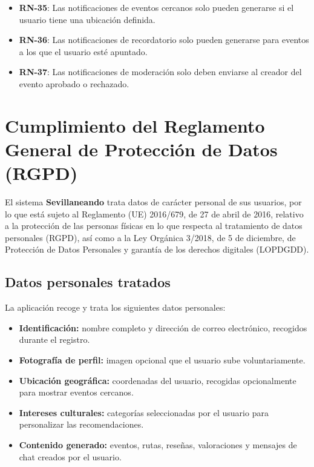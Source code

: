 \begin{itemize}
    \item \textbf{RN-35}: Las notificaciones de eventos cercanos solo pueden generarse si el usuario tiene una ubicación definida.
    \item \textbf{RN-36}: Las notificaciones de recordatorio solo pueden generarse para eventos a los que el usuario esté apuntado.
    \item \textbf{RN-37}: Las notificaciones de moderación solo deben enviarse al creador del evento aprobado o rechazado.
\end{itemize}

\section{Cumplimiento del Reglamento General de Protección de Datos (RGPD)}\label{sec:rgpd}

El sistema \textbf{Sevillaneando} trata datos de carácter personal de sus usuarios, por lo que está sujeto al Reglamento (UE) 2016/679, de 27 de abril de 2016, relativo a la protección de las personas físicas en lo que respecta al tratamiento de datos personales (RGPD), así como a la Ley Orgánica 3/2018, de 5 de diciembre, de Protección de Datos Personales y garantía de los derechos digitales (LOPDGDD).

\subsection{Datos personales tratados}

La aplicación recoge y trata los siguientes datos personales:

\begin{itemize}
    \item \textbf{Identificación:} nombre completo y dirección de correo electrónico, recogidos durante el registro.
    \item \textbf{Fotografía de perfil:} imagen opcional que el usuario sube voluntariamente.
    \item \textbf{Ubicación geográfica:} coordenadas del usuario, recogidas opcionalmente para mostrar eventos cercanos.
    \item \textbf{Intereses culturales:} categorías seleccionadas por el usuario para personalizar las recomendaciones.
    \item \textbf{Contenido generado:} eventos, rutas, reseñas, valoraciones y mensajes de chat creados por el usuario.
\end{itemize}

